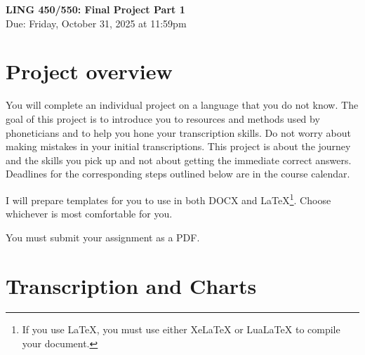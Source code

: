 \documentclass[12pt, letterpaper]{article}
\begin{document}


\begin{center}
     {\Large \textbf{LING 450/550: Final Project Part 1}}\\
    {\large Due: Friday, October 31, 2025 at 11:59pm}
\end{center}


\section*{Project overview} \label{}

You will complete an individual project on a language that you do not know. The goal of this project is to introduce you to resources and methods used by phoneticians and to help you hone your transcription skills. Do not worry about making mistakes in your initial transcriptions. This project is about the journey and the skills you pick up and not about getting the immediate correct answers. Deadlines for the corresponding steps outlined below are in the course calendar.

I will prepare templates for you to use in both DOCX and \LaTeX\footnote{If you use \LaTeX, you must use either XeLaTeX or LuaLaTeX to compile your document. }. Choose whichever is most comfortable for you. 

You must submit your assignment as a PDF.

\section*{Transcription and Charts} \label{}
\end{document}

